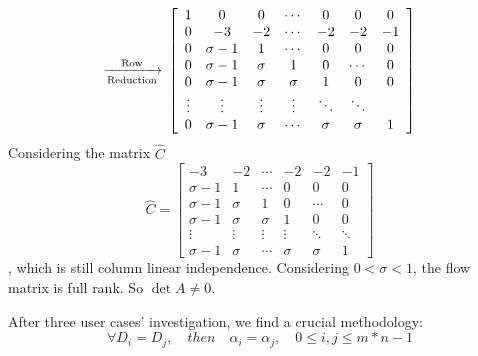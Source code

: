 \begin{equation*}
{\xrightarrow[\text{Reduction}]{\text{Row}}\\
\left[ \begin{array}{ccccccc}
1 & 0 & 0 & \cdots & 0 & 0 & 0\\
0 & -3 & -2 & \cdots& -2 & -2 & -1\\
0 & \sigma-1 & 1 & \cdots & 0 & 0 & 0 \\
0 & \sigma-1 & \sigma & 1 & 0 & \cdots & 0 \\
0 & \sigma-1 & \sigma & \sigma & 1 & 0 & 0 \\
\vdots & \vdots & \vdots  &   \vdots & \ddots & \ddots\\
0 & \sigma-1 & \sigma & \cdots & \sigma & \sigma & 1
\end{array} 
\right ]
}
\end{equation*}
Considering the matrix $\hat{C}$
\begin{equation}
{
\hat{C} = \left[ \begin{array}{cccccc}
-3 & -2 & \cdots& -2 & -2 & -1\\
\sigma-1 & 1 & \cdots & 0 & 0 & 0 \\
\sigma-1 & \sigma & 1 & 0 & \cdots & 0 \\
\sigma-1 & \sigma & \sigma & 1 & 0 & 0 \\
\vdots & \vdots & \vdots  &   \vdots & \ddots & \ddots\\
\sigma-1 & \sigma & \cdots & \sigma & \sigma & 1
\end{array} 
\right ]
}
\end{equation}
, which is still column linear independence.  Considering $0 < \sigma < 1$, the flow matrix is full rank. So $\det A \neq 0$.

After three user cases' investigation, we find a crucial methodology:
\textbf{$$\forall D_{i} = D_{j}, \quad then \quad \alpha_{i} = \alpha_{j},  \quad  0 \leq i,  j \leq m*n-1$$}